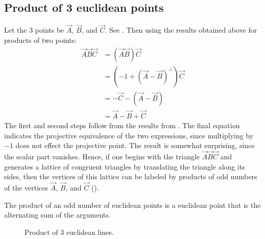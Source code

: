\documentclass{birkjour}
\newcommand{\mydogblue}{{\color{gray} $\square$~~}}
\begin{document}
 \subsection{Product of 3 euclidean points}
 Let the 3 points be $\vec{A}$, $\vec{B}$, and $\vec{C}$. See . Then using the results obtained above for products of two points:
 \begin{align*}
 \vec{A}\vec{B}\vec{C} &= (\vec{A} \vec{B})\vec{C} \\
 &= (-1 + (\vec{A} - \vec{B})^{\perp}) \vec{C} \\
 &= -\vec{C} - (\vec{A}-\vec{B}) \\
 &= \vec{A} -\vec{B} +\vec{C}
 \end{align*}
 The first and second steps follow from the results from .  The final equation indicates the projective equivalence of the two expressions, since multiplying by $-1$ does not effect the projective point.  The result is somewhat surprising, since the scalar part vanishes.  
 Hence, if one begins with the triangle $\vec{A}\vec{B}\vec{C}$ and generates a lattice of congruent triangles by translating the triangle along its sides, then the vertices of this lattice can be labeled by products of odd numbers of the vertices $\vec{A}$, $\vec{B}$, and $\vec{C}$ ().

 \myexercise  
 The product of an odd number of euclidean points is  a euclidean point that is the alternating sum of the arguments. %
 
  \begin{figure}[b]
   \centering
{\setlength\fboxsep{0pt}}
\caption{Product of 3 euclidean lines.}
\label{fig:trianglelns}
\end{figure}
\end{document}
